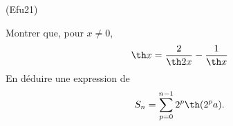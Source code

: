 \begin{tiny}(Efu21)\end{tiny} Montrer que, pour $x\neq 0$,
\begin{displaymath}
  \th x=\frac{2}{\th 2x}-\frac{1}{\th x}  
\end{displaymath}
En déduire une expression de
\begin{displaymath}
  S_{n}=\sum_{p=0}^{n-1}2^{p}\th (2^{p}a).
\end{displaymath}